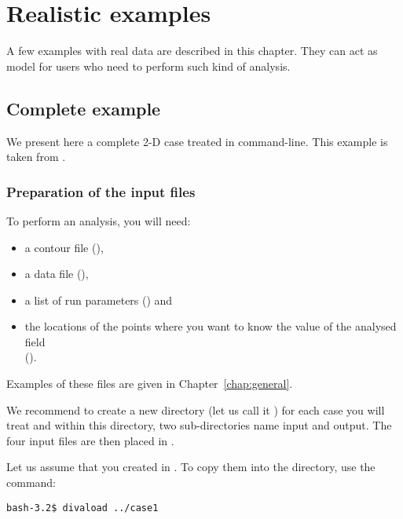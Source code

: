 \chapter{Realistic examples\label{chap:examples}}

A few examples with real data are described in this chapter. They can act as model for users who need to perform such kind of analysis. 

\minitoc

\newpage

\section{Complete example}

We present here a complete 2-D case treated in command-line. This example is taken from \citet{TROUPIN12}.

\subsection{Preparation of the input files\label{prep}}

To perform an analysis, you will need:
\begin{itemize}
\item a contour file (),
\item a data file (), 
\item a list of run parameters () and 
\item the locations of the points where you want to know the value of the analysed field\\ 
	  ().
\end{itemize}
Examples of these files are given in Chapter~\ref{chap:general}.

We recommend to create a new directory (let us call it ) for each case you will treat and within this directory, two sub-directories name input and output. The four input files are then placed in . 

Let us assume that you created  in . To copy them into the  directory, use the command: 

\vspace{.25cm}
\begin{lstlisting}[style=Bash]
bash-3.2$ divaload ../case1
\end{lstlisting}


